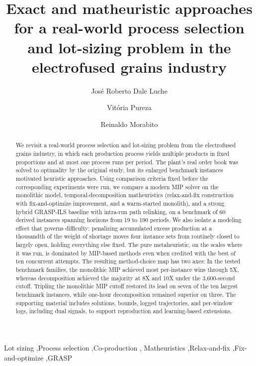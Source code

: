 \documentclass[review,authoryear]{elsarticle}
\begin{document}
\begin{frontmatter}

\title{Exact and matheuristic approaches for a real-world process
selection and lot-sizing problem in the electrofused grains industry}

\author[unesp]{Jos\'e Roberto Dale Luche}
\author[ufscar]{Vit\'oria Pureza}
\author[ufscar]{Reinaldo Morabito}
\address[unesp]{S\~ao Paulo State University (UNESP), Guaratinguet\'a, SP, Brazil} %
\address[ufscar]{Department of Production Engineering, Federal University of S\~ao Carlos (UFSCar), S\~ao Carlos, SP, Brazil}

\begin{abstract}
We revisit a real-world process selection and lot-sizing problem
from the electrofused grains industry, in which each production
process yields multiple products in fixed proportions and at most
one process runs per period. The plant's real order book was solved
to optimality by the original study, but its enlarged benchmark
instances motivated heuristic approaches. Using comparison criteria
fixed before the corresponding experiments were run, we compare
a modern MIP solver on
the monolithic model, temporal-decomposition matheuristics
(relax-and-fix construction with fix-and-optimize improvement, and
a warm-started monolith), and a strong hybrid GRASP-ILS baseline
with intra-run path relinking, on a benchmark of 60 derived
instances spanning horizons from 19 to 190 periods. We also
isolate a modeling effect that governs difficulty: penalizing
accumulated excess production at a thousandth of the weight of
shortage moves four instance sets from routinely closed to largely
open, holding everything else fixed. The pure metaheuristic,
on the scales where it was run, is dominated by MIP-based methods
even when credited with the best of ten concurrent attempts. The
resulting method-choice map has two axes:
In the tested benchmark families, the monolithic MIP achieved most
per-instance wins through 5X, whereas decomposition achieved the
majority at 8X and 10X under the 3{,}600-second cutoff. Tripling the
monolithic MIP cutoff restored its lead on seven of the ten largest
benchmark instances, while one-hour decomposition remained superior
on three. The supporting material includes solutions, bounds, logged
trajectories, and per-window logs, including
dual signals, to support reproduction and learning-based extensions.
\end{abstract}

\begin{keyword}
Lot sizing \sep Process selection \sep Co-production \sep
Matheuristics \sep Relax-and-fix \sep Fix-and-optimize \sep GRASP
\end{keyword}

\end{frontmatter}
\end{document}

